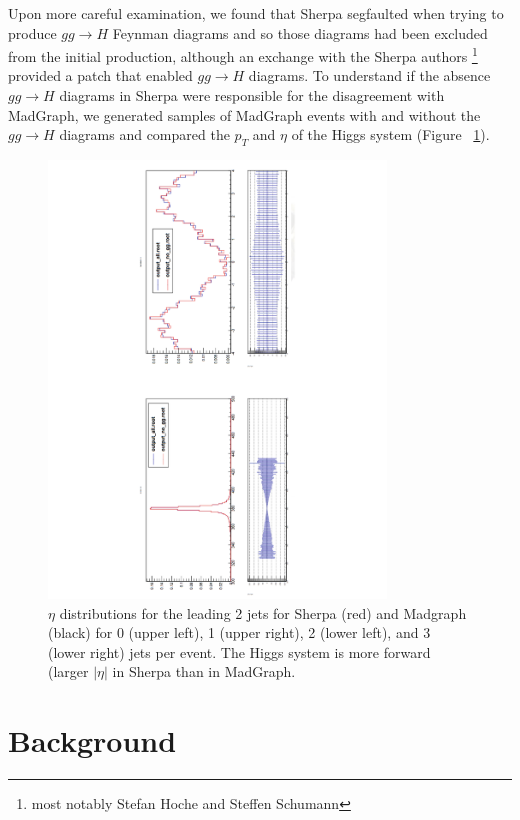 Upon more careful examination, we found that Sherpa segfaulted when trying to produce 
$gg\rightarrow H$ Feynman diagrams and so those diagrams had been excluded from
the initial production, although
an exchange with the Sherpa authors \footnote{most notably Stefan Hoche and Steffen 
Schumann} provided a patch that enabled $gg\rightarrow H$ diagrams.  To understand
if the absence $gg\rightarrow H$ diagrams in Sherpa were responsible for the disagreement
with MadGraph, we generated samples of MadGraph events with and without the $gg\rightarrow H$
diagrams and compared the $p_T$ and $\eta$ of the Higgs system (Figure ~\ref{fig:ggH}). 

\begin{figure}
  \center
  \includegraphics[width=0.8\textwidth, angle=270]{MonteCarlo/figures/ggH.pdf}
  \caption{$\eta$ distributions for the leading 2 jets for Sherpa (red) and Madgraph (black) for 0 (upper
  left), 1 (upper right), 2 (lower left), and 3 (lower right) jets per event. 
  The Higgs system is more forward (larger $|\eta|$ in Sherpa than in MadGraph.  \label{fig:ggH}}
\end{figure}




\section{Background}
